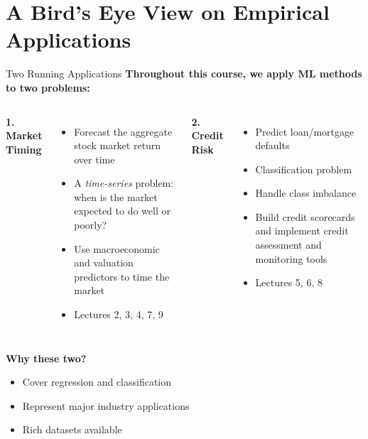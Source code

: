 \documentclass[10pt]{beamer}
\begin{document}
\section{A Bird's Eye View on Empirical Applications}

\begin{frame}{Two Running Applications}
  \textbf{Throughout this course, we apply ML methods to two problems:}
  
  \vspace{1em}
  \begin{columns}[T]
    \textbf{1. Market Timing}
    \begin{itemize}
      \item Forecast the aggregate stock market return over time
      \item A \emph{time-series} problem: when is the market expected to do well or poorly?
      \item Use macroeconomic and valuation predictors to time the market
      \item Lectures 2, 3, 4, 7, 9
    \end{itemize}
    
    \textbf{2. Credit Risk}
    \begin{itemize}
      \item Predict loan/mortgage defaults
      \item Classification problem
      \item Handle class imbalance
      \item Build credit scorecards and implement credit assessment and monitoring tools
      \item Lectures 5, 6, 8
    \end{itemize}
  \end{columns}
  
  \vspace{1em}
  \textbf{Why these two?}
  \begin{itemize}
    \item Cover regression and classification
    \item Represent major industry applications
    \item Rich datasets available
  \end{itemize}
\end{frame}
\end{document}
